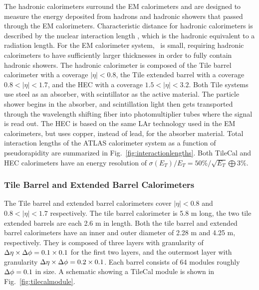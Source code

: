 The hadronic calorimeters surround the EM calorimeters and are designed to measure the energy deposited from hadrons and hadronic showers that passed through the EM calorimeters. Characteristic distance for hadronic calorimeters is described by the nuclear interaction length \intlen, which is the hadronic equivalent to a radiation length.  For the EM calorimeter system, \intlen\ is small, requiring hadronic calorimeters to have sufficiently larger thicknesses in order to fully contain hadronic showers. The hadronic calorimeter is composed of the Tile barrel calorimeter with a coverage $|\eta|<0.8$, the Tile extended barrel with a coverage $0.8<|\eta|<1.7$, and the HEC with a coverage $1.5<|\eta|<3.2$. Both Tile systems use steel as an absorber, with scintillator as the active material. The particle shower begins in the absorber, and scintillation light then gets transported through the wavelength shifting fiber into photomultiplier tubes where the signal is read out. The HEC is based on the same LAr technology used in the EM calorimeters, but uses copper, instead of lead, for the absorber material. Total interaction lengths of the ATLAS calorimeter system as a function of pseudorapidity are summarized in Fig.~\ref{fig:interactionlengths}. Both TileCal and HEC calorimeters have an energy resolution of $\sigma(E_{T})/E_{T}=50\%/\sqrt{E_{T}}\bigoplus3\%$. 

\subsubsection{Tile Barrel and Extended Barrel Calorimeters}
The Tile barrel and extended barrel calorimeters cover $|\eta|<0.8$ and $0.8<|\eta|<1.7$ respectively. The tile barrel calorimeter is 5.8 m long, the two tile extended barrels are each 2.6 m in length. Both the tile barrel and extended barrel calorimeters have an inner and outer diameter of 2.28 m and 4.25 m, respectively. They is composed of three layers with granularity of $\mbox{$\Delta \eta$}\times\mbox{$\Delta \phi$}=0.1\times0.1$ for the first two layers, and the outermost layer with granularity $\mbox{$\Delta \eta$}\times\mbox{$\Delta \phi$}=0.2\times0.1$. Each barrel consists of 64 modules roughly $\mbox{$\Delta \phi$}=0.1$ in size. A schematic showing a TileCal module is shown in Fig.~\ref{fig:tilecalmodule}.

